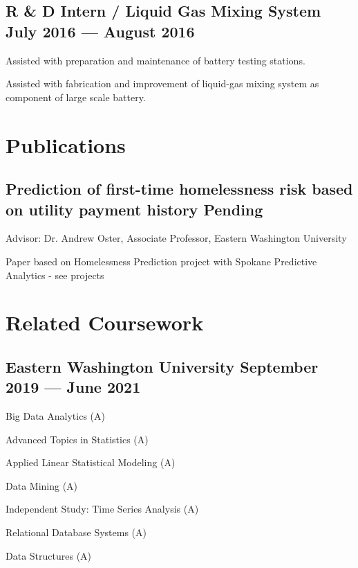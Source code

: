 \documentclass[letter,10pt]{article}
\begin{document}
\newpage
\subsection{{R \& D Intern / Liquid Gas Mixing System \hfill July 2016 --- August 2016}}
\begin{zitemize}
    \item Assisted with preparation and maintenance of battery testing stations.
    \item Assisted with fabrication and improvement of liquid-gas mixing system as component of large scale battery.
\end{zitemize}


\section{Publications}
\subsection{Prediction of first-time homelessness risk based on utility
payment history \hfill Pending}
\begin{zitemize}
    \item Advisor: Dr. Andrew Oster, Associate Professor, Eastern Washington University
    \item Paper based on Homelessness Prediction project with Spokane Predictive Analytics - see projects
\end{zitemize}


\section{Related Coursework}
\subsection{{Eastern Washington University \hfill September 2019 --- June 2021}}
\begin{zitemize}
    \item Big Data Analytics (A)
    \item Advanced Topics in Statistics (A)
    \item Applied Linear Statistical Modeling (A)
    \item Data Mining (A)
    \item Independent Study: Time Series Analysis (A)
    \item Relational Database Systems (A)
    \item Data Structures (A)
\end{zitemize}
\end{document}
